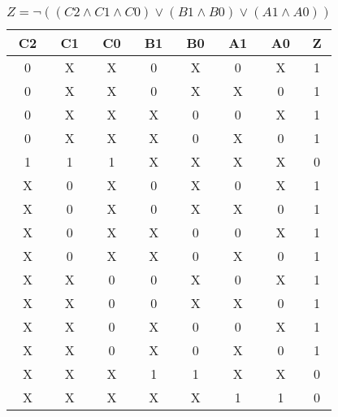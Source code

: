 \begin{center}
    \begin{table}[h] \caption{\(Z = \lnot ((C2 \land C1 \land C0) \lor (B1 \land B0) \lor (A1 \land A0)) \)}
        \begin{center}
            \begin{tabular}{|c|c|c|c|c|c|c||c|} \hline
            C2 & C1 & C0 & B1 & B0 & A1 & A0 & Z \\ \hline\hline
            0  & X  & X  & 0  & X  & 0  & X  & 1 \\ \hline
            0  & X  & X  & 0  & X  & X  & 0  & 1 \\ \hline
            0  & X  & X  & X  & 0  & 0  & X  & 1 \\ \hline
            0  & X  & X  & X  & 0  & X  & 0  & 1 \\ \hline
            1  & 1  & 1  & X  & X  & X  & X  & 0 \\ \hline
            X  & 0  & X  & 0  & X  & 0  & X  & 1 \\ \hline
            X  & 0  & X  & 0  & X  & X  & 0  & 1 \\ \hline
            X  & 0  & X  & X  & 0  & 0  & X  & 1 \\ \hline
            X  & 0  & X  & X  & 0  & X  & 0  & 1 \\ \hline
            X  & X  & 0  & 0  & X  & 0  & X  & 1 \\ \hline
            X  & X  & 0  & 0  & X  & X  & 0  & 1 \\ \hline
            X  & X  & 0  & X  & 0  & 0  & X  & 1 \\ \hline
            X  & X  & 0  & X  & 0  & X  & 0  & 1 \\ \hline
            X  & X  & X  & 1  & 1  & X  & X  & 0 \\ \hline
            X  & X  & X  & X  & X  & 1  & 1  & 0 \\ \hline
            \end{tabular}
        \end{center}
    \end{table}
\end{center}
